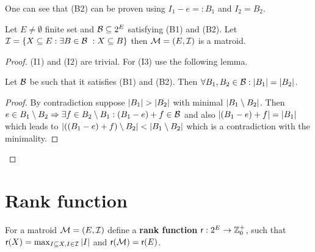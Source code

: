 One can see that (B2) can be proven using $I_1 - e =: B_1$ and $I_2 = B_2$.

\begin{prop}
	Let $E \neq \emptyset$ finite set and $\mathcal{B} \subseteq 2^E$ satisfying (B1) and (B2). Let $\mathcal{I} = \{X \subseteq E : \exists B \in \mathcal{B}\ : X \subseteq B\}$ then $\mathcal{M} = (E, \mathcal{I})$ is a matroid.
\end{prop}

\begin{proof}
	(I1) and (I2) are trivial. For (I3) use the following lemma.
	
	\begin{lemma}
		Let $\mathcal{B}$ be such that it satisfies (B1) and (B2). Then $\forall B_1, B_2 \in \mathcal{B} : |B_1| = |B_2|$.
	\end{lemma}
	
	\begin{proof}
		By contradiction suppose $\left|{B_1}\right| > \left|{B_2}\right|$ with minimal $\left|{B_1 \setminus B_2}\right|$. Then $e \in B_1 \setminus B_2 \Rightarrow \exists f \in B_2 \setminus B_1: (B_1 - e) + f \in \mathcal{B}$ and also $\left|{(B_1 - e) + f}\right| = |B_1|$ which leads to $\left|{((B_1 - e) + f) \setminus B_2}\right| < \left|{B_1 \setminus B_2}\right|$ which is a contradiction with the minimality.
	\end{proof}
\end{proof}

\section{Rank function}

\begin{defn}
	For a matroid $\mathcal{M} = (E, \mathcal{I})$ define a \textbf{rank function} $\operatorname{\textsf{r}} : 2^E \to \mathbb{Z}^+_0$, such that $\operatorname{\textsf{r}}(X) = \max_{I \subseteq X, I \in \mathcal{I}} |I|$ and $\operatorname{\textsf{r}} (\mathcal{M}) = \operatorname{\textsf{r}}(E)$.
\end{defn}